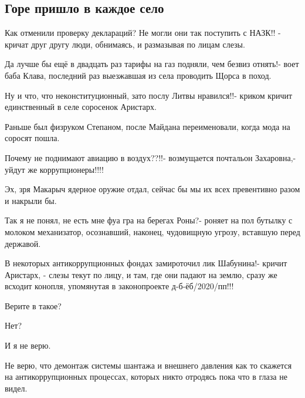  
 
 

\subsection{Горе пришло в каждое село}
\label{sec:30_10_2020.fb.max_buzhanskii.1.dek_selo}


Как отменили проверку деклараций? Не могли они так поступить с НАЗК!! - кричат
друг другу люди, обнимаясь, и размазывая по лицам слезы.

Да лучше бы ещё в двадцать раз тарифы на газ подняли, чем безвиз отнять!- воет
баба Клава, последний раз выезжавшая из села проводить Щорса в поход.

Ну и что, что неконституционный, зато послу Литвы нравился!!- криком кричит
единственный в селе соросенок Аристарх.

Раньше был физруком Степаном, после Майдана переименовали, когда мода на
соросят пошла.

Почему не поднимают авиацию в воздух??!!- возмущается почтальон Захаровна,-
уйдут же коррупционеры!!!!

Эх, зря Макарыч ядерное оружие отдал, сейчас бы мы их всех превентивно разом и
накрыли бы.

Так я не понял, не есть мне фуа гра на берегах Роны?- роняет на пол бутылку с
молоком механизатор, осознавший, наконец, чудовищную угрозу, вставшую перед
державой.

В некоторых антикоррупционных фондах замироточил лик Шабунина!- кричит
Аристарх, - слезы текут по лицу, и там, где они падают на землю, сразу же
всходит конопля, упомянутая в законопроекте д-б-ёб/2020/пп!!!

Верите в такое?

Нет?

И я не верю.

Не верю, что демонтаж системы шантажа и внешнего давления как то скажется на
антикоррупционных процессах, которых никто отродясь пока что в глаза не видел.

